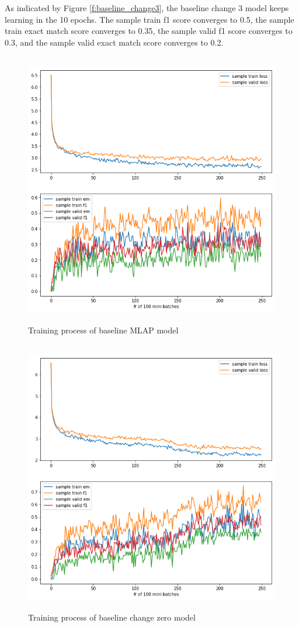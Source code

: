 \documentclass[modernstyle,12pt]{sjsuthesis}
\theoremstyle{definition}
\begin{document}
As indicated by Figure \ref{f:baseline_change3}, the baseline change 3 model keeps learning in the 10 epochs. The sample train f1 score converges to 0.5, the sample train exact match score converges to 0.35, the sample valid f1 score converges to 0.3, and the sample valid exact match score converges to 0.2.

\begin{figure}[htbp]\centering
  \includegraphics[width=12cm, height=12cm]{figures/match_corrected.png}
  \caption{Training process of baseline MLAP model}
  \label{f:mlap}
\end{figure}

\begin{figure}[htbp]\centering
  \includegraphics[width=12cm, height=12cm]{figures/match_baseline.png}
  \caption{Training process of baseline change zero model}
  \label{f:baseline_change0}
\end{figure}
\end{document}
